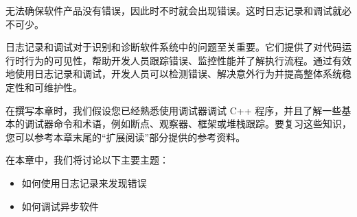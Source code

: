 无法确保软件产品没有错误，因此时不时就会出现错误。这时日志记录和调试就必不可少。

日志记录和调试对于识别和诊断软件系统中的问题至关重要。它们提供了对代码运行时行为的可见性，帮助开发人员跟踪错误、监控性能并了解执行流程。通过有效地使用日志记录和调试，开发人员可以检测错误、解决意外行为并提高整体系统稳定性和可维护性。

在撰写本章时，我们假设您已经熟悉使用调试器调试 C++ 程序，并且了解一些基本的调试器命令和术语，例如断点、观察器、框架或堆栈跟踪。要复习这些知识，您可以参考本章末尾的“扩展阅读”部分提供的参考资料。

在本章中，我们将讨论以下主要主题：

\begin{itemize}
\item
如何使用日志记录来发现错误

\item
如何调试异步软件
\end{itemize}